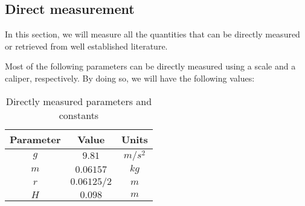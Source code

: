 \subsection{Direct measurement}
\label{subsec:direct_measurement}

In this section, we will measure all the quantities that can be directly measured or retrieved from well established literature.

Most of the following parameters can be directly measured using a scale and a caliper, respectively.
By doing so, we will have the following values:

\begin{table}[H]

    \centering
    \begin{tabular}{|c|c|c|}
        \hline
        \textbf{Parameter} & \textbf{Value} & \textbf{Units} \\
        \hline
        $g$                & $9.81$         & $m/s^2$        \\
        $m$                & $0.06157$      & $kg$           \\
        $r$                & $0.06125/2$    & $m$            \\
        $H$                & $0.098$        & $m$            \\
        \hline
    \end{tabular}

    \caption{Directly measured parameters and constants}
    \label{tab:directly_measured_parameters}

\end{table}